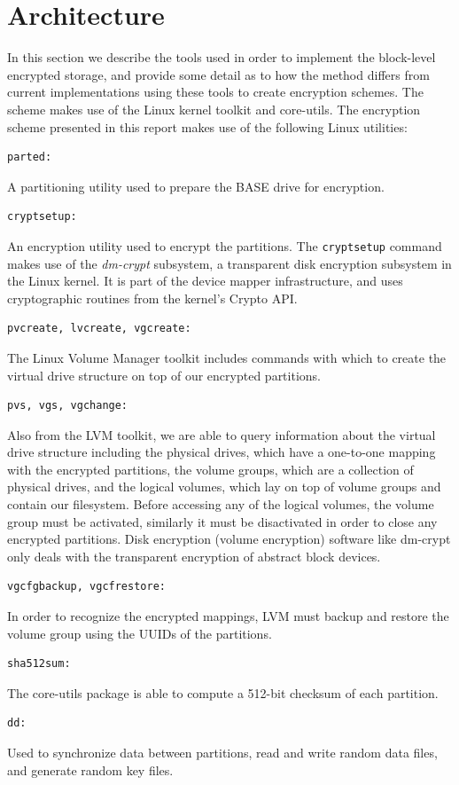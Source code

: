 \documentclass[12pt]{article}
\begin{document}
\section{Architecture}

In this section we describe the tools used in order to implement the block-level encrypted storage, and provide some detail as to how the method differs from current implementations using these tools to create encryption schemes. The scheme makes use of the Linux kernel toolkit and core-utils. The encryption scheme presented in this report makes use of the following Linux utilities:
\begin{verbatim}
parted:
\end{verbatim}
A partitioning utility used to prepare the BASE drive for encryption.
\begin{verbatim}
cryptsetup: 
\end{verbatim}
An encryption utility used to encrypt the partitions. The \verb|cryptsetup| command makes use of the \emph{dm-crypt} subsystem, a transparent disk encryption subsystem in the Linux kernel. It is part of the device mapper infrastructure, and uses cryptographic routines from the kernel's Crypto API.
\begin{verbatim}
pvcreate, lvcreate, vgcreate:
\end{verbatim}
The Linux Volume Manager toolkit includes commands with which to create the virtual drive structure on top of our encrypted partitions.
\begin{verbatim}
pvs, vgs, vgchange:
\end{verbatim}
Also from the LVM toolkit, we are able to query information about the virtual drive structure including the physical drives, which have a one-to-one mapping with the encrypted partitions, the volume groups, which are a collection of physical drives, and the logical volumes, which lay on top of volume groups and contain our filesystem. Before accessing any of the logical volumes, the volume group must be activated, similarly it must be disactivated in order to close any encrypted partitions. Disk encryption (volume encryption) software like dm-crypt only deals with the transparent encryption of abstract block devices.
\begin{verbatim}
vgcfgbackup, vgcfrestore:
\end{verbatim}
In order to recognize the encrypted mappings, LVM must backup and restore the volume group using the UUIDs of the partitions.
\begin{verbatim}
sha512sum:
\end{verbatim}
The core-utils package is able to compute a 512-bit checksum of each partition.
\begin{verbatim}
dd:
\end{verbatim}
Used to synchronize data between partitions, read and write random data files, and generate random key files.
\end{document}

